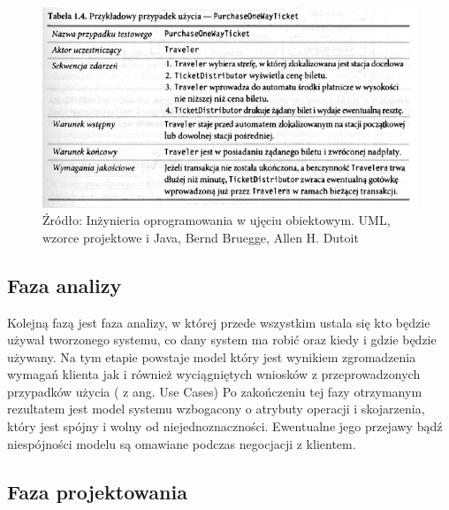 \documentclass[oneside,polski,logo]{amuthesis}
\begin{document}
\begin{figure}[h]
	\centering
	\includegraphics[width=14cm]{images/hyps/use-case.png}
	\caption{Źródło:  Inżynieria oprogramowania w ujęciu obiektowym. UML, wzorce projektowe i Java, Bernd Bruegge, Allen H. Dutoit}
\end{figure}

\subsection {Faza analizy}

Kolejną fazą jest faza analizy, w której przede wszystkim ustala się kto będzie używał tworzonego systemu, co dany system ma robić oraz kiedy i gdzie będzie używany. Na tym etapie powstaje model który jest wynikiem zgromadzenia wymagań klienta jak i również wyciągniętych wniosków z przeprowadzonych przypadków użycia ( z ang. Use Cases) Po zakończeniu tej fazy otrzymanym rezultatem jest model systemu wzbogacony o atrybuty operacji i skojarzenia, który jest spójny i wolny od niejednoznaczności. Ewentualne jego przejawy bądź niespójności modelu są omawiane podczas negocjacji z klientem.\\

\subsection {Faza projektowania}
\end{document}
